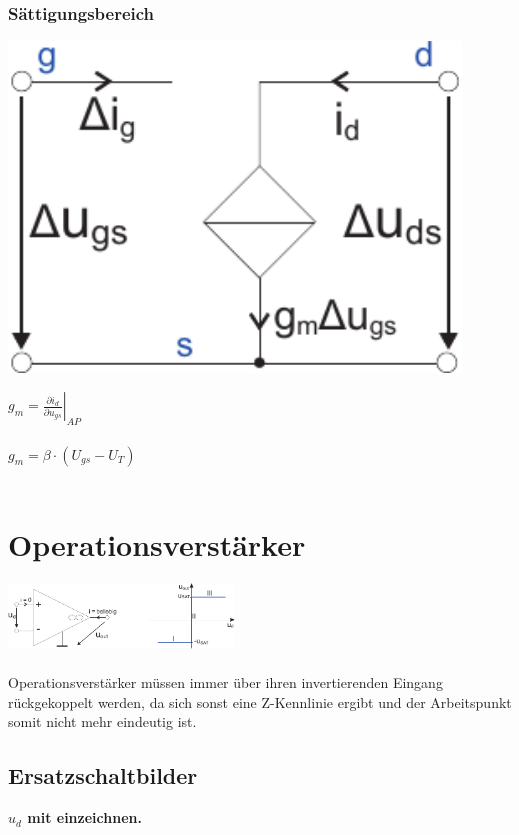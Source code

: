 \documentclass[a4paper,twocolumn,10pt]{article}
\begin{document}
\subsubsection*{Sättigungsbereich}
\begin{minipage}[b]{0.25\textwidth}
\includegraphics[width=0.9\textwidth]{img/FET_KSE_sat}
\end{minipage}
\hfill
\begin{minipage}[b]{0.2\textwidth}
$g_m=\left.\frac{\partial i_d}{\partial u_{gs}}\right|_{AP}$\\\\
$g_m=\beta \cdot (U_{gs}-U_T)$\\\\
\end{minipage}

\section*{Operationsverstärker}
\includegraphics[width=0.45\textwidth]{img/OP}\\\\
Operationsverstärker müssen immer über ihren invertierenden Eingang rückgekoppelt werden, da sich sonst eine Z-Kennlinie ergibt und der Arbeitspunkt somit nicht mehr eindeutig ist.
\subsection*{Ersatzschaltbilder}
\textbf{$u_d$ mit einzeichnen.}
\end{document}
